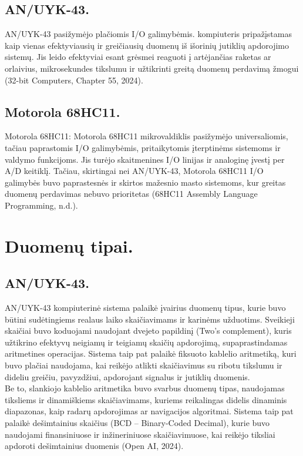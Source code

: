 \documentclass[a4paper,12pt]{article}
\begin{document}
\subsection{AN/UYK-43.}
AN/UYK-43 pasižymėjo plačiomis I/O galimybėmis. kompiuteris pripažįstamas kaip vienas efektyviausių ir greičiausių duomenų iš išorinių jutiklių apdorojimo sistemų. Jis leido efektyviai esant grėsmei reaguoti į artėjančias raketas ar orlaivius, mikrosekundes tikslumu ir užtikrinti greitą duomenų perdavimą žmogui (32-bit Computers, Chapter 55, 2024).
\subsection{Motorola 68HC11.}
Motorola 68HC11: Motorola 68HC11 mikrovaldiklis pasižymėjo universaliomis, tačiau paprastomis I/O galimybėmis, pritaikytomis įterptinėms sistemoms ir valdymo funkcijoms. Jis turėjo skaitmenines I/O linijas ir analoginę įvestį per A/D keitiklį. Tačiau, skirtingai nei AN/UYK-43, Motorola 68HC11 I/O galimybės buvo paprastesnės ir skirtos mažesnio masto sistemoms, kur greitas duomenų perdavimas nebuvo prioritetas (68HC11 Assembly Language Programming, n.d.).

\section{Duomenų tipai.}
\subsection{AN/UYK-43.}
AN/UYK-43 kompiuterinė sistema palaikė įvairius duomenų tipus, kurie buvo būtini sudėtingiems realaus laiko skaičiavimams ir karinėms užduotims. Sveikieji skaičiai buvo koduojami naudojant dvejeto papildinį (Two's complement), kuris užtikrino efektyvų neigiamų ir teigiamų skaičių apdorojimą, supaprastindamas aritmetines operacijas. Sistema taip pat palaikė fiksuoto kablelio aritmetiką, kuri buvo plačiai naudojama, kai reikėjo atlikti skaičiavimus su ribotu tikslumu ir dideliu greičiu, pavyzdžiui, apdorojant signalus ir jutiklių duomenis.\\
Be to, slankiojo kablelio aritmetika buvo svarbus duomenų tipas, naudojamas tiksliems ir dinamiškiems skaičiavimams, kuriems reikalingas didelis dinaminis diapazonas, kaip radarų apdorojimas ar navigacijos algoritmai. Sistema taip pat palaikė dešimtainius skaičius (BCD – Binary-Coded Decimal), kurie buvo naudojami finansiniuose ir inžineriniuose skaičiavimuose, kai reikėjo tiksliai apdoroti dešimtainius duomenis (Open AI, 2024).
\end{document}

